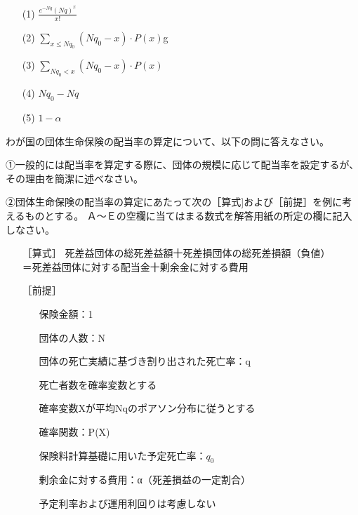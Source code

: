 \documentclass[report,gutter=10mm,fore-edge=10mm,uplatex,dvipdfmx]{jlreq}
\begin{document}
\begin{itemize}
 \item [(1)]  $\frac{e^{-Nq}(Nq)^x}{x!}$
 \item [(2)]  $\sum\limits_{x\leq Nq_0}(Nq_0-x)\cdot P(x)$g
 \item [(3)]  $\sum\limits_{Nq_0 < x} (Nq_0-x)\cdot P(x)$
 \item [(4)]  $Nq_0-Nq$
 \item [(5)]  $1-\alpha$
\end{itemize}

わが国の団体生命保険の配当率の算定について、以下の問に答えなさい。

①一般的には配当率を算定する際に、団体の規模に応じて配当率を設定するが、その理由を簡潔に述べなさい。

②団体生命保険の配当率の算定にあたって次の［算式]および［前提］を例に考えるものとする。
Ａ～Ｅの空欄に当てはまる数式を解答用紙の所定の欄に記入しなさい。

\begin{screen}
\begin{itemize}
\item[ ［算式］]  死差益団体の総死差益額十死差損団体の総死差損額（負値）\\
 ＝死差益団体に対する配当金十剰余金に対する費用
\item[［前提］] 
\begin{itemize}
\item[] 保険金額：1
\item[] 団体の人数：N
\item[] 団体の死亡実績に基づき割り出された死亡率：q
\item[] 死亡者数を確率変数とする
\item[] 確率変数Xが平均Nqのポアソン分布に従うとする
\item[] 確率関数：P(X)
\item[] 保険料計算基礎に用いた予定死亡率：$q_0$
\item[] 剰余金に対する費用：α（死差損益の一定割合）
\item[] 予定利率および運用利回りは考慮しない
\end{itemize}
\end{itemize}
\end{screen}
\end{document}
